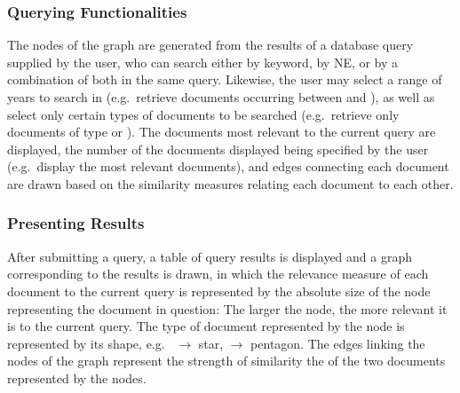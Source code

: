 \subsubsection {Querying Functionalities}
\label{sec:querying_functionalities}
The nodes of the graph are generated from the results of a database query supplied by the user, who can search either by keyword, by NE, or by a combination of both in the same query. Likewise, the user may select a range of years to search in (e.g.\ retrieve documents occurring between  and ), as well as select only certain types of documents to be searched (e.g.\ retrieve only documents of type  or ). The documents most relevant to the current query are displayed, the number of the documents displayed being specified by the user (e.g.\ display the  most relevant documents), and edges connecting each document are drawn based on the similarity measures relating each document to each other.

\subsubsection {Presenting Results}
\label{sec:presenting_results}
After submitting a query, a table of query results is displayed and a graph corresponding to the results is drawn, in which the relevance measure of each document to the current query is represented by the absolute size of the node representing the document in question: The larger the node, the more relevant it is to the current query. The type of document represented by the node is represented by its shape, e.g.\  $\rightarrow$ star,  $\rightarrow$ pentagon. The edges linking the nodes of the graph represent the strength of similarity the of the two documents represented by the nodes.
